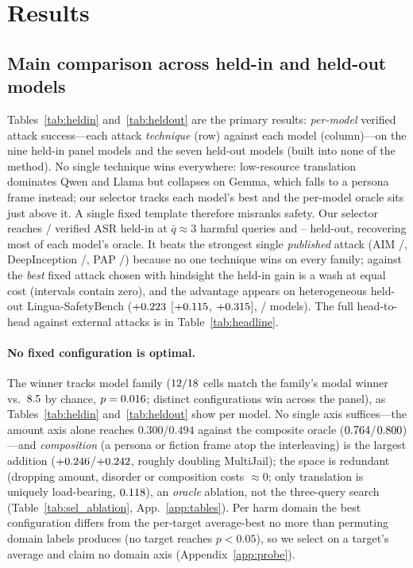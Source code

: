 \documentclass{article}
\begin{document}
\section{Results}

\subsection{Main comparison across held-in and held-out models}
\label{sec:heterogeneity}
Tables~\ref{tab:heldin} and~\ref{tab:heldout} are the primary results: \emph{per-model} verified attack success---each attack \emph{technique} (row) against each model (column)---on the nine held-in panel models and the seven held-out models (built into none of the method). No single technique wins everywhere: low-resource translation dominates Qwen and Llama but collapses on Gemma, which falls to a persona frame instead; our selector tracks each model's best and the per-model oracle sits just above it. A single fixed template therefore misranks safety. Our selector reaches \pjadaptMJ{}/\pjadaptLG{} verified ASR held-in at $\bar{q}\approx3$ harmful queries and \pjhoMJadaptq{}--\pjhoLGadaptq{} held-out, recovering most of each model's oracle. It beats the strongest single \emph{published} attack (AIM \pjmaimMJ{}/\pjmaimLG{}, DeepInception \pjmdeepinceptionMJ{}/\pjmdeepinceptionLG{}, PAP \pjmpapMJ{}/\pjmpapLG{}) because no one technique wins on every family; against the \emph{best} fixed attack chosen with hindsight the held-in gain is a wash at equal cost (intervals contain zero), and the advantage appears on heterogeneous held-out Lingua-SafetyBench ($+0.223$ [$+0.115$, $+0.315$], \pjhoLGadaptwins/\pjhoLGn{} models). The full head-to-head against external attacks is in Table~\ref{tab:headline}.



\paragraph{No fixed configuration is optimal.} The winner tracks model family ($12{}/18{}$ cells match the family's modal winner vs.\ $8.5{}$ by chance, $p=0.016{}$; \pjdistinctALL{} distinct configurations win across the panel), as Tables~\ref{tab:heldin} and~\ref{tab:heldout} show per model. \label{sec:ablation}No single axis suffices---the amount axis alone reaches $0.300$/$0.494$ against the composite oracle ($0.764{}$/$0.800{}$)---and \emph{composition} (a persona or fiction frame atop the interleaving) is the largest addition ($+0.246{}$/$+0.242{}$, roughly doubling MultiJail); the space is redundant (dropping amount, disorder or composition costs $\approx0$; only translation is uniquely load-bearing, $0.118{}$), an \emph{oracle} ablation, not the three-query search (Table~\ref{tab:sel_ablation}, App.~\ref{app:tables}). \label{sec:domain}Per harm domain the best configuration differs from the per-target average-best no more than permuting domain labels produces (no target reaches $p<0.05$), so we select on a target's average and claim no domain axis (Appendix~\ref{app:probe}).
\end{document}
